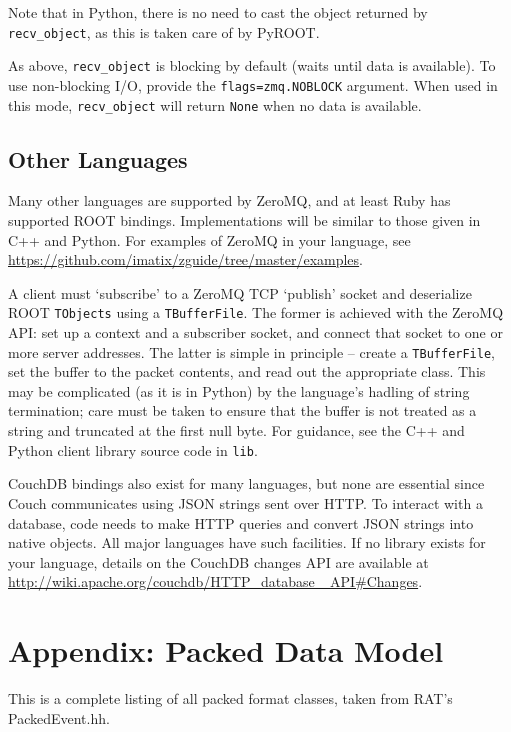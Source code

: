 \documentclass{article}
\begin{document}
Note that in Python, there is no need to cast the object returned by {\tt recv\_object}, as this is taken care of by PyROOT.

As above, {\tt recv\_object} is blocking by default (waits until data is available). To use non-blocking I/O, provide the {\tt flags=zmq.NOBLOCK} argument. When used in this mode, {\tt recv\_object} will return {\tt None} when no data is available.

\subsection{Other Languages}

Many other languages are supported by ZeroMQ, and at least Ruby has supported ROOT bindings. Implementations will be similar to those given in C++ and Python. For examples of ZeroMQ in your language, see \href{https://github.com/imatix/zguide/tree/master/examples}{https://github.com/imatix/zguide/tree/master/examples}.

A client must `subscribe' to a ZeroMQ TCP `publish' socket and deserialize ROOT {\tt TObjects} using a {\tt TBufferFile}. The former is achieved with the ZeroMQ API: set up a context and a subscriber socket, and connect that socket to one or more server addresses. The latter is simple in principle -- create a {\tt TBufferFile}, set the buffer to the packet contents, and read out the appropriate class. This may be complicated (as it is in Python) by the language's hadling of string termination; care must be taken to ensure that the buffer is not treated as a string and truncated at the first null byte. For guidance, see the C++ and Python client library source code in {\tt lib}.


CouchDB bindings also exist for many languages, but none are essential since Couch communicates using JSON strings sent over HTTP. To interact with a database, code needs to make HTTP queries and convert JSON strings into native objects. All major languages have such facilities. If no library exists for your language, details on the CouchDB changes API are available at \href{http://wiki.apache.org/couchdb/HTTP\_database\_API\#Changes}{http://wiki.apache.org/couchdb/HTTP\_database \_API\#Changes}.

\clearpage
\section{Appendix: Packed Data Model}
This is a complete listing of all packed format classes, taken from RAT's PackedEvent.hh.
\end{document}
